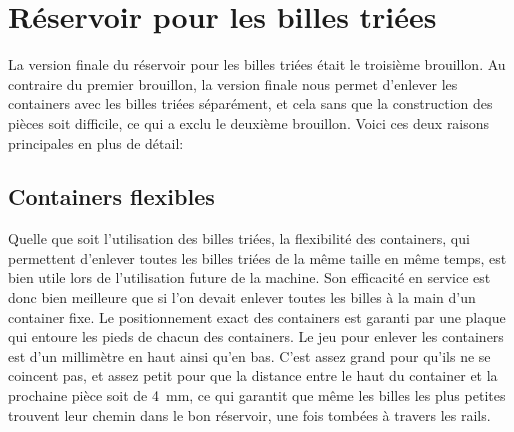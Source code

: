 



\section{Réservoir pour les billes triées}
La version finale du réservoir pour les billes triées était le troisième brouillon. Au contraire du premier brouillon, la version finale nous permet d'enlever les containers avec les billes triées séparément, et cela sans que la construction des pièces soit difficile, ce qui a exclu le deuxième brouillon. Voici ces deux raisons principales en plus de détail:

\subsection{Containers flexibles}
Quelle que soit l'utilisation des billes triées, la flexibilité des containers, qui permettent d'enlever toutes les billes triées de la même taille en même temps, est bien utile lors de l'utilisation future de la machine. Son efficacité en service est donc bien meilleure que si l'on devait enlever toutes les billes à la main d'un container fixe. Le positionnement exact des containers est garanti par une plaque %
qui entoure les pieds de chacun des containers. Le jeu pour enlever les containers est d'un millimètre en haut ainsi qu'en bas. C'est assez grand pour qu'ils ne se coincent pas, et assez petit pour que la distance entre le haut du container et la prochaine pièce soit de \SI{4}{\mm}, ce qui garantit que même les billes les plus petites trouvent leur chemin dans le bon réservoir, une fois tombées à travers les rails.

